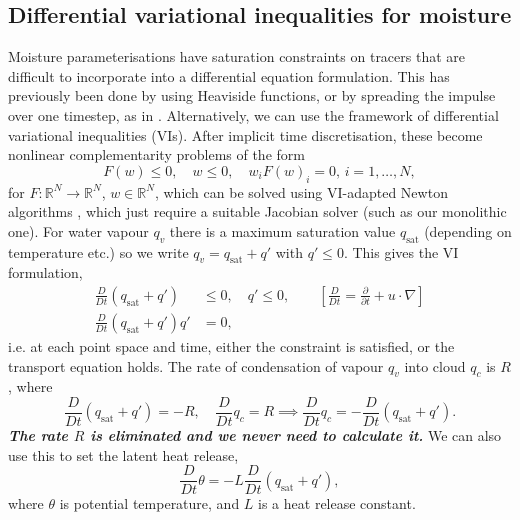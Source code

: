 \documentclass[
]{ImperialPoster}
\DeclareMathOperator{\sat}{sat}
\newcommand{\pp}[2]{\frac{\partial #1}{\partial #2}}
\newcommand{\DD}[2]{\frac{D #1}{D #2}}
\begin{document}
\begin{multicols}{3}
\vspace{-10mm}
\section{Differential variational inequalities for moisture}
Moisture parameterisations have saturation constraints on tracers that
are difficult to incorporate into a differential equation formulation.
This has previously been done by using Heaviside functions, or by
spreading the impulse over one timestep, as in
\cite{zerroukat2015moist,rostami2018improved}. Alternatively, we can
use the framework of differential variational inequalities
(VIs). After implicit time discretisation, these become nonlinear
complementarity problems of the form
\[
{F}({w}) \leq 0, \quad {w} \leq 0, \quad w_iF(w)_i=0, \, i=1,\ldots,N,
\]
for $F:\mathbb{R}^N\to \mathbb{R}^N$, $w\in \mathbb{R}^N$, which can
be solved using VI-adapted Newton algorithms \cite{bueler2020petsc},
which just require a suitable Jacobian solver (such as our monolithic
one).
For water vapour $q_v$ there is a maximum saturation value $q_{\sat}$
(depending on temperature etc.) so we write $q_v=q_{\sat}+q'$ with
$q'\leq 0$. This gives the VI formulation,
\begin{align*}
\DD{}{t}(q_{\sat}+q') & \leq 0,  \quad
q' \leq 0, \qquad \left[ \DD{}{t} = \pp{}{t} + u\cdot \nabla\right] \\
\DD{}{t}(q_{\sat}+q')q' & = 0, 
\end{align*}
i.e. at each point space and time, either the constraint is satisfied,
or the transport equation holds.
The rate of condensation of vapour $q_v$ into cloud $q_c$ is $R$, where
\[
\DD{}{t}(q_{\sat}+q') = -R, \quad
\DD{}{t}q_c = R \implies
\DD{}{t}q_c = -\DD{}{t}(q_{\sat}+q').
\]
\emph{\bfseries The rate $R$ is eliminated and we never need to calculate it.}
We can also use this to set the latent heat release,
\[
\DD{}{t}\theta = -L\DD{}{t}(q_{\sat}+q'),
\]
where $\theta$ is potential temperature, and $L$ is a heat release constant.



\end{multicols}
\end{document}
